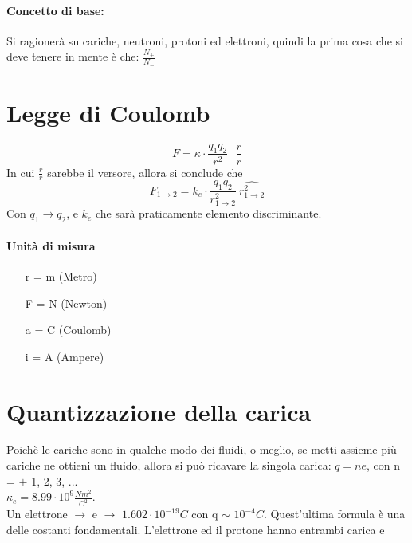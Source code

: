 \documentclass[12pt, a4paper, openany, oneside]{book}
\begin{document}
\paragraph{Concetto di base: }Si ragionerà su cariche, neutroni, protoni
ed elettroni, quindi la prima cosa che si deve tenere in mente è che: 
$\frac{N_{+}}{N_{-}}$ 
\section{Legge di Coulomb}
\[
F = \kappa \cdot \frac{q_{1} q_{2}}{r^{2}} ~~~ \frac{r}{r}
\]		
In cui $\frac{r}{r}$ sarebbe il versore, allora si conclude che
\[
F_{1 \to 2} = k_{e} \cdot \frac{q_{1} q_{2}}{r^{2}_{1 \to 2}} ~ \widehat{r^{2}_{1 \to 2}}	
\]     
Con $q_{1} \to q_{2}$, e $k_{e}$ che sarà praticamente elemento discriminante. 
\paragraph{Unità di misura}
\begin{itemize}
	\item [r] = m (Metro)
	\item [F] = N (Newton)
	\item [a] = C (Coulomb)
	\item [i] = A (Ampere)
\end{itemize}
\section{Quantizzazione della carica}
Poichè le cariche sono in qualche modo dei fluidi, o meglio, se metti assieme
più cariche ne ottieni un fluido, allora si può ricavare la singola carica:
$q=ne$, con n = $\pm$ 1, 2, 3, ...\\

$\kappa_{e} = 8.99\cdot10^{9} \frac{Nm^{2}}{C^{2}}$.\\
Un elettrone $\to$ e $\to$ $1.602 \cdot 10^{-19}C$ con q $\sim$ $10^{-4}C$.
Quest'ultima formula è una delle costanti fondamentali. L'elettrone ed il 
protone hanno entrambi carica e 
\end{document}

